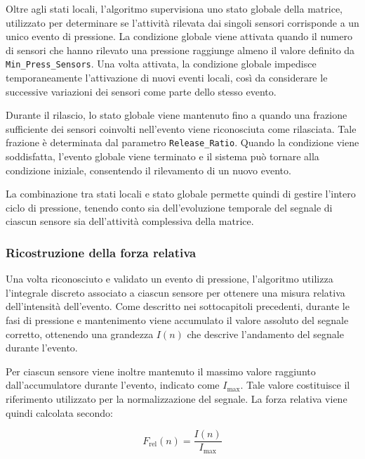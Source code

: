 \documentclass[10pt, a4paper]{article}
\begin{document}
                Oltre agli stati locali, l'algoritmo supervisiona uno stato globale della matrice, utilizzato per determinare se l'attività rilevata dai singoli sensori corrisponde a un unico evento 
                di pressione. La condizione globale viene attivata quando il numero di sensori che hanno rilevato una pressione raggiunge almeno il valore definito da \texttt{Min\_Press\_Sensors}. 
                Una volta attivata, la condizione globale impedisce temporaneamente l'attivazione di nuovi eventi locali, così da considerare le successive variazioni dei sensori come parte dello
                stesso evento.

                Durante il rilascio, lo stato globale viene mantenuto fino a quando una frazione sufficiente dei sensori coinvolti nell'evento viene riconosciuta come rilasciata. 
                Tale frazione è determinata dal parametro \texttt{Release\_Ratio}. Quando la condizione viene soddisfatta, l'evento globale viene terminato e il sistema può tornare 
                alla condizione iniziale, consentendo il rilevamento di un nuovo evento.

                La combinazione tra stati locali e stato globale permette quindi di gestire l'intero ciclo di pressione, tenendo conto sia dell'evoluzione temporale del segnale di ciascun 
                sensore sia dell'attività complessiva della matrice.

            \subsubsection{Ricostruzione della forza relativa}

                Una volta riconosciuto e validato un evento di pressione, l'algoritmo utilizza l'integrale discreto associato a ciascun sensore per ottenere una misura relativa dell'intensità dell'evento. 
                Come descritto nei sottocapitoli precedenti, durante le fasi di pressione e mantenimento viene accumulato il valore assoluto del segnale corretto, ottenendo una grandezza $I(n)$ che
                descrive l'andamento del segnale durante l'evento.

                Per ciascun sensore viene inoltre mantenuto il massimo valore raggiunto dall'accumulatore durante l'evento, indicato come $I_{\mathrm{max}}$. Tale valore costituisce il riferimento 
                utilizzato per la normalizzazione del segnale. La forza relativa viene quindi calcolata secondo:

                    \begin{equation}
                    F_{\mathrm{rel}}(n) =
                    \frac{I(n)}{I_{\mathrm{max}}}
                    \end{equation}
\end{document}

